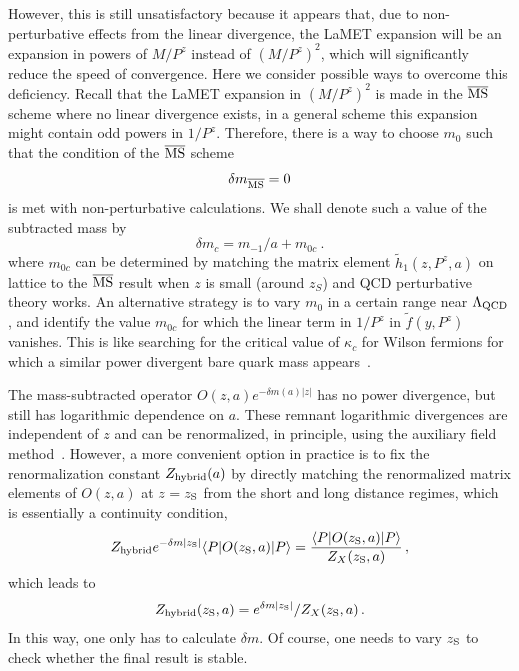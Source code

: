 However, this is still unsatisfactory because it appears that, due to non-perturbative
effects from the linear divergence, the LaMET expansion will be
an expansion in powers of $M/P^z$ instead of $(M/P^z)^2$, which
will significantly reduce the speed of convergence. Here
we consider possible ways to overcome this deficiency. Recall that the LaMET expansion in $(M/P^z)^2$ is
made in the ${\overline{\rm MS}}$ scheme where no linear divergence exists, in a general scheme this expansion might
contain odd powers in $1/P^z$. Therefore, there is a way to choose $m_0$
such that the condition of the $\overline{\rm  MS}$ scheme
\begin{equation}
      \delta m_{\overline{\rm MS}} = 0
\end{equation}
is met with non-perturbative calculations.
We shall denote such a value of the subtracted mass
by \begin{equation}
\delta m_c = m_{-1}/a + m_{0c}\ .
\end{equation}
where $m_{0c}$ can be determined by matching the matrix element $\tilde h_1(z, P^z, a)$ on lattice
to the $\overline{\rm MS}$ result when $z$ is small (around $z_S$) and
QCD perturbative theory works. An alternative strategy
is to vary $m_{0}$ in a certain range near $\Lambda_{\rm QCD}$,
and identify the value $m_{0c}$ for which the linear term in $1/P^z$ in $\tilde f(y, P^z)$ vanishes.
This is like searching for the critical value of $\kappa_c$ for Wilson
fermions for which a similar power divergent
bare quark mass appears~\cite{Lepage:1992xa}.

The mass-subtracted operator $O(z,a)e^{-\delta m(a)|z|}$
has no power divergence, but still has logarithmic
dependence on $a$.
These remnant logarithmic divergences are independent of $z$ and can be renormalized, in principle, using the auxiliary field method~\cite{Green:2017xeu,Green:2020xco}.
However, a more convenient option in practice is to fix the renormalization constant $Z_{\rm hybrid}(a)$ by directly
matching the renormalized matrix elements of $O(z,a)$ at $z=z_{\rm S}$ from the short and long distance regimes, which is essentially a continuity condition,
\begin{align}
Z_{\rm hybrid} e^{-\delta m |z_{\rm S}|}\langle P| O(z_{\rm S},a) | P \rangle  = \frac{\langle P| O(z_{\rm S},a) | P \rangle }{Z_X(z_{\rm S},a) }\,,
\end{align}
which leads to
\begin{align}
Z_{\rm hybrid}(z_{\rm S},a) = e^{\delta m |z_{\rm S}|}/{Z_X(z_{\rm S},a)  }\,.
\end{align}
In this way, one only has to calculate $\delta m$. Of course, one needs to vary $z_{\rm S}$ to check whether the final result is stable.


